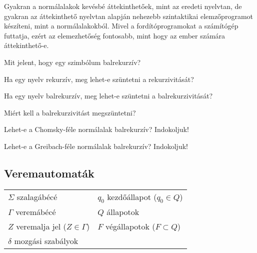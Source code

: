 \documentclass[a4paper]{article}
\begin{document}
Gyakran a normálalakok kevésbé áttekinthetőek, mint az eredeti nyelvtan,
de gyakran az áttekinthető nyelvtan alapján nehezebb szintaktikai
elemzőprogramot készíteni, mint a normálalakokból. Mivel a
fordítóprogramokat a számítógép futtatja, ezért az elemezhetőség
fontosabb, mint hogy az ember számára áttekinthető-e.

Mit jelent, hogy egy szimbólum balrekurzív?

Ha egy nyelv rekurzív, meg lehet-e szüntetni a rekurzivitását?

Ha egy nyelv balrekurzív, meg lehet-e szüntetni a balrekurzivitását?

Miért kell a balrekurzivitást megszüntetni?

Lehet-e a Chomsky-féle normálalak balrekurzív? Indokoljuk!

Lehet-e a Greibach-féle normálalak balrekurzív? Indokoljuk!

\subsection{Veremautomaták}


\vspace{.6em}

\begin{tabular}{|*{2}{l|}}
\hline
$\Sigma$ szalagábécé&
$q_0$ kezdőállapot ($q_0 \in Q$)
\\
$\Gamma$ veremábécé &
$Q$ állapotok
\\
$Z$ veremalja jel  ($Z \in \Gamma$)&
$F$ végállapotok  ($F \subset Q$)\\
$\delta$ mozgási szabályok&
\\
\hline
\end{tabular}
\end{document}
